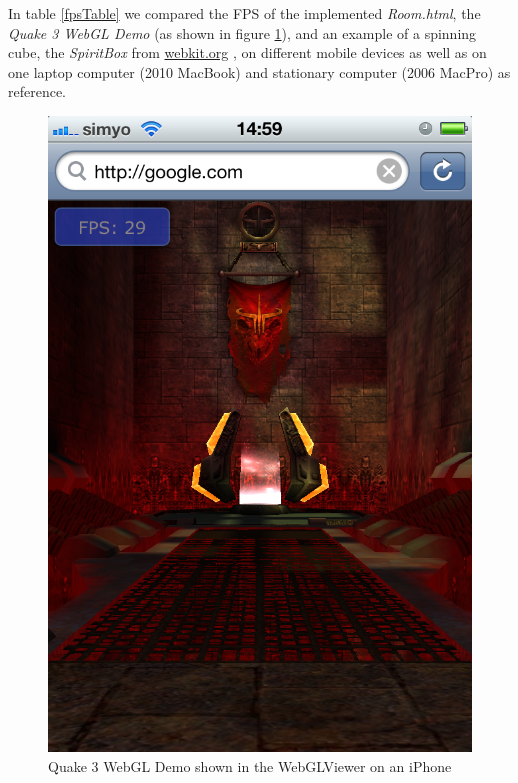 \documentclass[12pt,journal,compsoc]{IEEEtran}
\begin{document}
In table \ref{fpsTable} we compared the FPS of the implemented \textit{Room.html}, the \textit{Quake 3 WebGL Demo} \cite{quakewebgl} (as shown in figure \ref{fig:quake3}), and an example of a spinning cube, the \textit{SpiritBox} from \url {webkit.org} \cite{SpiritBox}, on different mobile devices as well as on one laptop computer (2010 MacBook) and stationary computer (2006 MacPro) as reference. 

\begin{figure}[htb]
	\centerline{\includegraphics[width=0.7\columnwidth]{grafiken/quake3}}
	\caption{Quake 3 WebGL Demo \cite{quakewebgl} shown in the WebGLViewer on an iPhone}
	\label{fig:quake3}
\end{figure}
\end{document}
